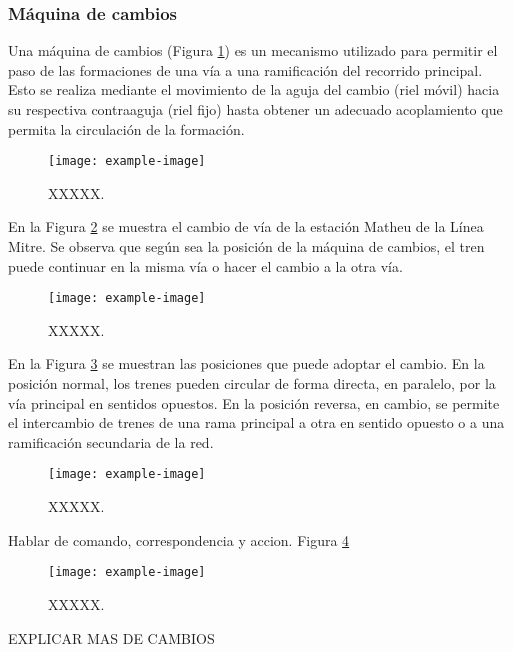 \subsubsection{Máquina de cambios}

    Una máquina de cambios (Figura \ref{fig:cambios_1}) es un mecanismo utilizado para permitir el paso de las formaciones de una vía a una ramificación del recorrido principal. Esto se realiza mediante el movimiento de la aguja del cambio (riel móvil) hacia su respectiva contraaguja (riel fijo) hasta obtener un adecuado acoplamiento que permita la circulación de la formación.

    \begin{figure}[h]
        \centering
        \texttt{[image: example-image]}
        \centering\caption{XXXXX.}
        \label{fig:cambios_1}
    \end{figure}

    En la Figura \ref{fig:cambios_2} se muestra el cambio de vía de la estación Matheu de la Línea Mitre. Se observa que según sea la posición de la máquina de cambios, el tren puede continuar en la misma vía o hacer el cambio a la otra vía.

    \begin{figure}[h]
        \centering
        \texttt{[image: example-image]}
        \centering\caption{XXXXX.}
        \label{fig:cambios_2}
    \end{figure}


    En la Figura \ref{fig:cambios_3} se muestran las posiciones que puede adoptar el cambio. En la posición normal, los trenes pueden circular de forma directa, en paralelo, por la vía principal en sentidos opuestos. En la posición reversa, en cambio, se permite el intercambio de trenes de una rama principal a otra en sentido opuesto o a una ramificación secundaria de la red.

    \begin{figure}[h]
        \centering
        \texttt{[image: example-image]}
        \centering\caption{XXXXX.}
        \label{fig:cambios_3}
    \end{figure}

    Hablar de comando, correspondencia y accion. Figura \ref{fig:cambios_4}

    \lipsum[1]
    
    \begin{figure}[h]
        \centering
        \texttt{[image: example-image]}
        \centering\caption{XXXXX.}
        \label{fig:cambios_4}
    \end{figure}

EXPLICAR MAS DE CAMBIOS